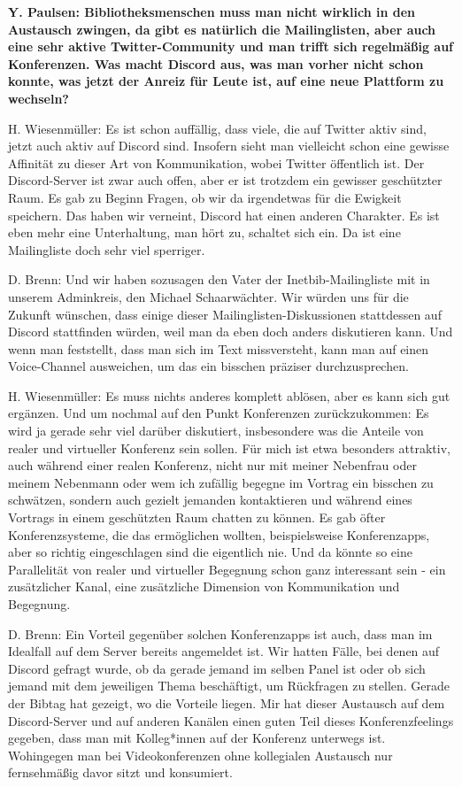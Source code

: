 \documentclass[a4paper,
fontsize=11pt,
oneside,
numbers=noperiodatend,
parskip=half-,
bibliography=totoc,
final
]{scrartcl}
\begin{document}
\textbf{Y. Paulsen: Bibliotheksmenschen muss man nicht wirklich in den
Austausch zwingen, da gibt es natürlich die Mailinglisten, aber auch
eine sehr aktive Twitter-Community und man trifft sich regelmäßig auf
Konferenzen. Was macht Discord aus, was man vorher nicht schon konnte,
was jetzt der Anreiz für Leute ist, auf eine neue Plattform zu
wechseln?}

H. Wiesenmüller: Es ist schon auffällig, dass viele, die auf Twitter
aktiv sind, jetzt auch aktiv auf Discord sind. Insofern sieht man
vielleicht schon eine gewisse Affinität zu dieser Art von Kommunikation,
wobei Twitter öffentlich ist. Der Discord-Server ist zwar auch offen,
aber er ist trotzdem ein gewisser geschützter Raum. Es gab zu Beginn
Fragen, ob wir da irgendetwas für die Ewigkeit speichern. Das haben wir
verneint, Discord hat einen anderen Charakter. Es ist eben mehr eine
Unterhaltung, man hört zu, schaltet sich ein. Da ist eine Mailingliste
doch sehr viel sperriger.

D. Brenn: Und wir haben sozusagen den Vater der Inetbib-Mailingliste mit
in unserem Adminkreis, den Michael Schaarwächter. Wir würden uns für die
Zukunft wünschen, dass einige dieser Mailinglisten-Diskussionen
stattdessen auf Discord stattfinden würden, weil man da eben doch anders
diskutieren kann. Und wenn man feststellt, dass man sich im Text
missversteht, kann man auf einen Voice-Channel ausweichen, um das ein
bisschen präziser durchzusprechen.

H. Wiesenmüller: Es muss nichts anderes komplett ablösen, aber es kann
sich gut ergänzen. Und um nochmal auf den Punkt Konferenzen
zurückzukommen: Es wird ja gerade sehr viel darüber diskutiert,
insbesondere was die Anteile von realer und virtueller Konferenz sein
sollen. Für mich ist etwa besonders attraktiv, auch während einer realen
Konferenz, nicht nur mit meiner Nebenfrau oder meinem Nebenmann oder wem
ich zufällig begegne im Vortrag ein bisschen zu schwätzen, sondern auch
gezielt jemanden kontaktieren und während eines Vortrags in einem
geschützten Raum chatten zu können. Es gab öfter Konferenzsysteme, die
das ermöglichen wollten, beispielsweise Konferenzapps, aber so richtig
eingeschlagen sind die eigentlich nie. Und da könnte so eine
Parallelität von realer und virtueller Begegnung schon ganz interessant
sein - ein zusätzlicher Kanal, eine zusätzliche Dimension von
Kommunikation und Begegnung.

D. Brenn: Ein Vorteil gegenüber solchen Konferenzapps ist auch, dass man
im Idealfall auf dem Server bereits angemeldet ist. Wir hatten Fälle,
bei denen auf Discord gefragt wurde, ob da gerade jemand im selben Panel
ist oder ob sich jemand mit dem jeweiligen Thema beschäftigt, um
Rückfragen zu stellen. Gerade der Bibtag hat gezeigt, wo die Vorteile
liegen. Mir hat dieser Austausch auf dem Discord-Server und auf anderen
Kanälen einen guten Teil dieses Konferenzfeelings gegeben, dass man mit
Kolleg*innen auf der Konferenz unterwegs ist. Wohingegen man bei
Videokonferenzen ohne kollegialen Austausch nur fernsehmäßig davor sitzt
und konsumiert.
\end{document}
